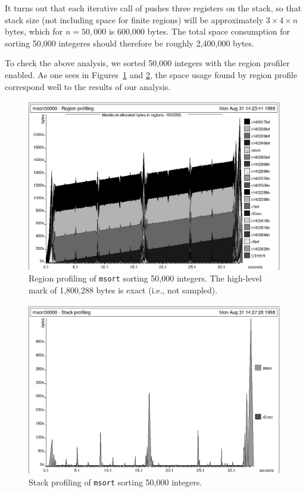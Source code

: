 \documentclass[12pt]{book}
\begin{document}
It turns out that each iterative call of  pushes
three registers on the stack, so that stack size (not including
space for finite regions) will be approximately $3\times 4\times n$
bytes, which for $n=50,000$ is 600,000 bytes. 
The total space consumption for sorting 50,000 integeres
should therefore be roughly 2,400,000 bytes.


To check the above analysis, we sorted 50,000 integers with the region
profiler enabled.  As one sees in Figures~\ref{msortregion.fig}
and \ref{msortstack.fig}, the space
usage found by region profile correspond well to the results
of our analysis. 
\begin{figure}%
\begin{center}
\includegraphics{msortregion.ps}
\end{center}
\caption{Region profiling of {\tt msort} sorting 50,000
integers. The high-level mark of 1,800,288 bytes is exact (i.e., not sampled).}
\label{msortregion.fig}
\end{figure}

\begin{figure}%
\begin{center}
\includegraphics{msortstack.ps}
\end{center}
\caption{Stack profiling of {\tt msort} sorting 50,000
integers.}
\label{msortstack.fig}
\end{figure}
\end{document}
